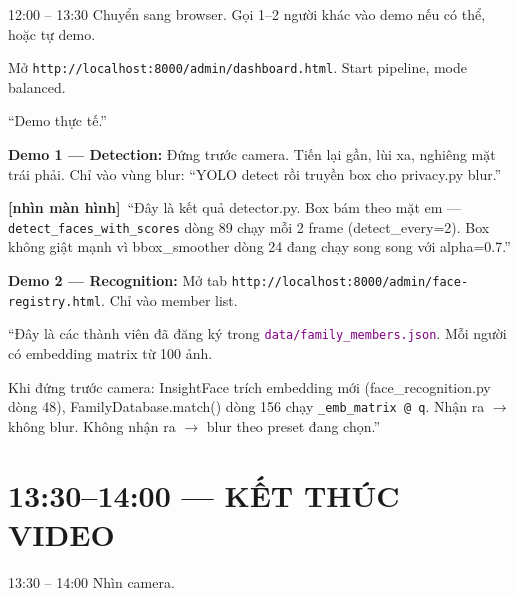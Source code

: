 \documentclass[12pt, a4paper]{article}
\newcommand{\fpath}[1]{\texttt{\textcolor{purple}{#1}}}
\newcommand{\screen}{\textcolor{OliveGreen}{\textbf{[nhìn màn hình]}}}
\begin{document}
\begin{timing}{12:00 -- 13:30}
Chuyển sang browser. Gọi 1--2 người khác vào demo nếu có thể, hoặc tự demo.
\end{timing}

\begin{doact}
Mở \texttt{http://localhost:8000/admin/dashboard.html}.
Start pipeline, mode balanced.
\end{doact}

\begin{say}
``Demo thực tế.''
\end{say}

\begin{doact}
\textbf{Demo 1 --- Detection:}
Đứng trước camera. Tiến lại gần, lùi xa, nghiêng mặt trái phải.
Chỉ vào vùng blur: ``YOLO detect rồi truyền box cho privacy.py blur.''
\end{doact}

\begin{say}
\screen\ ``Đây là kết quả detector.py.
Box bám theo mặt em --- \texttt{detect\_faces\_with\_scores} dòng 89 chạy mỗi 2 frame (detect\_every=2).
Box không giật mạnh vì bbox\_smoother dòng 24 đang chạy song song với alpha=0.7.''
\end{say}

\begin{doact}
\textbf{Demo 2 --- Recognition:}
Mở tab \texttt{http://localhost:8000/admin/face-registry.html}.
Chỉ vào member list.
\end{doact}

\begin{say}
``Đây là các thành viên đã đăng ký trong \fpath{data/family\_members.json}.
Mỗi người có embedding matrix từ 100 ảnh.

Khi đứng trước camera: InsightFace trích embedding mới (face\_recognition.py dòng 48),
FamilyDatabase.match() dòng 156 chạy \texttt{\_emb\_matrix @ q}.
Nhận ra $\to$ không blur. Không nhận ra $\to$ blur theo preset đang chọn.''
\end{say}

\section{13:30--14:00 --- KẾT THÚC VIDEO}

\begin{timing}{13:30 -- 14:00}
Nhìn camera.
\end{timing}
\end{document}
